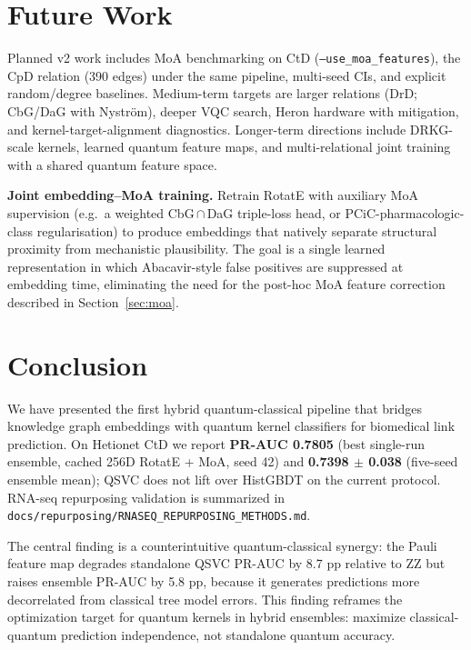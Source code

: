 \documentclass[10pt,twocolumn]{article}
\begin{document}
\section{Future Work}
\label{sec:future}

\noindent
Planned v2 work includes MoA benchmarking on CtD (\texttt{--use\_moa\_features}), the CpD relation (390 edges) under the same pipeline, multi-seed CIs, and explicit random/degree baselines.
Medium-term targets are larger relations (DrD; CbG/DaG with Nystr\"{o}m), deeper VQC search, Heron hardware with mitigation, and kernel-target-alignment diagnostics.
Longer-term directions include DRKG-scale kernels, learned quantum feature maps, and multi-relational joint training with a shared quantum feature space.

\textbf{Joint embedding--MoA training.} Retrain RotatE with auxiliary MoA supervision (e.g.\ a weighted CbG\,$\cap$\,DaG triple-loss head, or PCiC-pharmacologic-class regularisation) to produce embeddings that natively separate structural proximity from mechanistic plausibility. The goal is a single learned representation in which Abacavir-style false positives are suppressed at embedding time, eliminating the need for the post-hoc MoA feature correction described in Section~\ref{sec:moa}.

\section{Conclusion}

We have presented the first hybrid quantum-classical pipeline that bridges knowledge graph embeddings with quantum kernel classifiers for biomedical link prediction. On Hetionet CtD we report \textbf{PR-AUC 0.7805} (best single-run ensemble, cached 256D RotatE + MoA, seed 42) and \textbf{0.7398 $\pm$ 0.038} (five-seed ensemble mean); QSVC does not lift over HistGBDT on the current protocol. RNA-seq repurposing validation is summarized in \texttt{docs/repurposing/RNASEQ\_REPURPOSING\_METHODS.md}.

The central finding is a counterintuitive quantum-classical synergy: the Pauli feature map degrades standalone QSVC PR-AUC by 8.7 pp relative to ZZ but raises ensemble PR-AUC by 5.8 pp, because it generates predictions more decorrelated from classical tree model errors. This finding reframes the optimization target for quantum kernels in hybrid ensembles: maximize classical-quantum prediction independence, not standalone quantum accuracy.
\end{document}
